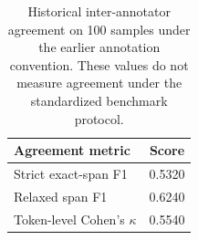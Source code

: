 \begin{table}[htbp]
\caption{Historical inter-annotator agreement on 100 samples under the earlier annotation convention. These values do not measure agreement under the standardized benchmark protocol.}
\label{tab:iaa}
\centering
\small
\begin{tabular}{lc}
\toprule
\textbf{Agreement metric} & \textbf{Score} \\
\midrule
Strict exact-span F1 & 0.5320 \\
Relaxed span F1 & 0.6240 \\
Token-level Cohen's $\kappa$ & 0.5540 \\
\bottomrule
\end{tabular}
\end{table}
